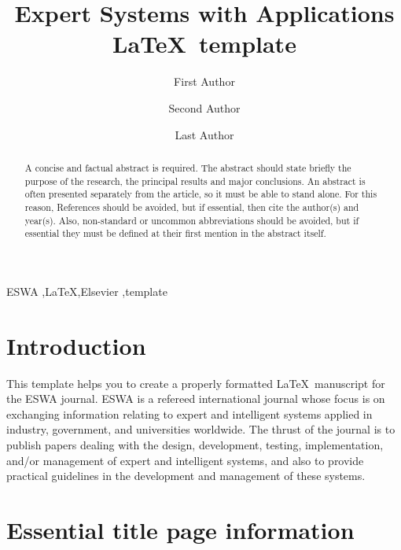 \documentclass[review]{elsarticle}
\begin{document}
\begin{frontmatter}
\title{Expert Systems with Applications \LaTeX\ template}

\author[label1,label2]{First Author}

\author[label1]{Second Author}

\author[label3]{Last Author }

\address[label1]{Full address of first author, including the country name}
\address[label2]{Full address of second author, including the country name}
\address[label3]{Full address of last author, including the country name}

\begin{abstract}
A concise and factual abstract is required. The abstract should state briefly the purpose of the research, the principal results and major conclusions. An abstract is often presented separately from the article, so it must be able to stand alone. For this reason, References should be avoided, but if essential, then cite the author(s) and year(s). Also, non-standard or uncommon abbreviations should be avoided, but if essential they must be defined at their first mention in the abstract itself.
\end{abstract}

\begin{keyword}
ESWA \sep \LaTeX \sep Elsevier \sep template
\end{keyword}

\end{frontmatter}

\section{Introduction}
\label{introduction}

This template helps you to create a properly formatted \LaTeX\ manuscript for the ESWA journal. ESWA is a refereed international journal whose focus is on exchanging information relating to expert and intelligent systems applied in industry, government, and universities worldwide. The thrust of the journal is to publish papers dealing with the design, development, testing, implementation, and/or management of expert and intelligent systems, and also to provide practical guidelines in the development and management of these systems. 

\section{Essential title page information}
\label{title_page}
\end{document}
